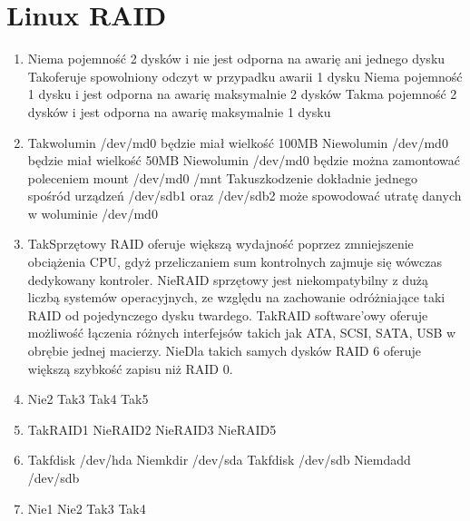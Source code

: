 
\newpage
\section{Linux RAID}
	\begin{enumerate}
		\item {}%
		{Nie}{ma pojemność 2 dysków i nie jest odporna na awarię ani jednego dysku}%
		{Tak}{oferuje spowolniony odczyt w przypadku awarii 1 dysku}%
		{Nie}{ma pojemność 1 dysku i jest odporna na awarię maksymalnie 2 dysków}%
		{Tak}{ma pojemność 2 dysków i jest odporna na awarię maksymalnie 1 dysku}
		\item {}%
		{Tak}{wolumin /dev/md0 będzie miał wielkość 100MB}%
		{Nie}{wolumin /dev/md0 będzie miał wielkość 50MB}%
		{Nie}{wolumin /dev/md0 będzie można zamontować poleceniem mount /dev/md0 /mnt}%
		{Tak}{uszkodzenie dokładnie jednego spośród urządzeń /dev/sdb1 oraz /dev/sdb2 może spowodować utratę danych w woluminie /dev/md0}
		\item {}%
		{Tak}{Sprzętowy RAID oferuje większą wydajność poprzez zmniejszenie obciążenia CPU, gdyż przeliczaniem sum kontrolnych zajmuje się wówczas dedykowany kontroler.}%
		{Nie}{RAID sprzętowy jest niekompatybilny z dużą liczbą systemów operacyjnych, ze względu na zachowanie odróżniające taki RAID od pojedynczego dysku twardego.}%
		{Tak}{RAID software'owy oferuje możliwość łączenia różnych interfejsów takich jak ATA, SCSI, SATA, USB w obrębie jednej macierzy.}%
		{Nie}{Dla takich samych dysków RAID 6 oferuje większą szybkość zapisu niż RAID 0.}
		\item {}%
		{Nie}{2}%
		{Tak}{3}%
		{Tak}{4}%
		{Tak}{5}
		\item {}%
		{Tak}{RAID1}%
		{Nie}{RAID2}%
		{Nie}{RAID3}%
		{Nie}{RAID5}
		\item {}%
		{Tak}{fdisk /dev/hda}%
		{Nie}{mkdir /dev/sda}%
		{Tak}{fdisk /dev/sdb}%
		{Nie}{mdadd /dev/sdb}
		\item {}%
		{Nie}{1}%
		{Nie}{2}%
		{Tak}{3}%
		{Tak}{4}
		

\end{enumerate}
